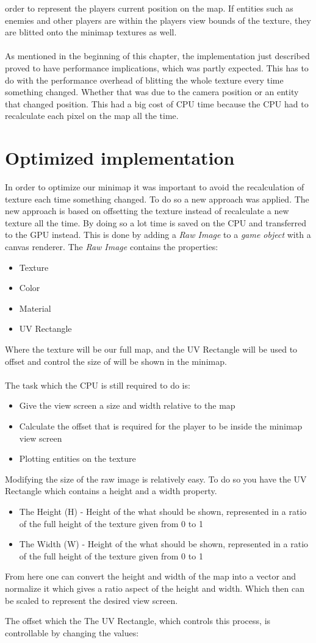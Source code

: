 order to represent the players current position on the map. If entities such as
enemies and other players are within the players view bounds of the
texture, they are blitted onto the minimap textures as well. 
\\
\\
As mentioned in the beginning of this chapter, the implementation just
described proved to have performance implications, which was partly expected. 
This has to do with the performance overhead of blitting the whole texture every time something changed.
Whether that was due to the camera position or an entity that changed position.
This had a big cost of CPU time because the CPU had to recalculate each pixel on the map all the time.


\section{Optimized implementation}
In order to optimize our minimap it was important to avoid the recalculation of texture each time something changed.
To do so a new approach was applied. 
The new approach is based on offsetting the texture instead of recalculate a new texture all the time.
By doing so a lot time is saved on the CPU and transferred to the GPU instead. 
This is done by adding a \textit{Raw Image} to a \textit{game object} with a canvas renderer.
The \textit{Raw Image} contains the properties:
\begin{itemize}
\item Texture
\item Color
\item Material
\item UV Rectangle
\end{itemize}
Where the texture will be our full map, and the UV Rectangle will be used to offset and control the size of will be shown in the minimap.
\\\\
The task which the CPU is still required to do is:
\begin{itemize}
\item Give the view screen a size and width relative to the map
\item Calculate the offset that is required for the player to be inside the minimap view screen
\item Plotting entities on the texture
\end{itemize}
Modifying the size of the raw image is relatively easy. To do so you have the UV Rectangle which contains a height and a width property.
\begin{itemize}
\item The Height (H) - Height of the what should be shown, represented in a ratio of the full height of the texture given from 0 to 1
\item  The Width (W) - Height of the what should be shown, represented in a ratio of the full height of the texture given from 0 to 1
\end{itemize}
From here one can convert the height and width of the map into a vector and normalize it which gives a  ratio aspect of the height and width. Which then can be scaled to represent the desired view screen.

The offset which the
The UV Rectangle, which controls this process, is controllable by changing the values:



